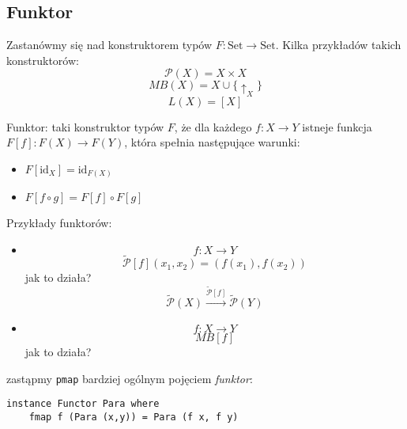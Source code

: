 \documentclass[11pt,a4paper]{article}
\begin{document}
\subsection{Funktor}
Zastanówmy się nad konstruktorem typów $F: \text{Set} \rightarrow \text{Set}$. Kilka przykładów takich konstruktorów:
\[
    \mathcal{P}(X) = X \times X
\]
\[
    MB(X) = X \cup \{ \uparrow_X \}
\]
\[
    L(X) = [X]
\]

Funktor: taki konstruktor typów $F$, że dla każdego $f: X \rightarrow Y$ istneje funkcja $F[f]: F(X) \rightarrow F(Y)$, która spełnia następujące warunki:
\begin{itemize}
    \item $F[\text{id}_X] = \text{id}_{F(X)}$
    \item $F[f \circ g] = F[f] \circ F[g]$
\end{itemize}
Przykłady funktorów:
\begin{itemize}
    \item
        \[
            f: X \rightarrow Y
        \]
        \[
            \tilde{\mathcal{P}}[f](x_1, x_2) = (f(x_1), f(x_2))
        \]
        jak to działa?
        \[
            \tilde{\mathcal{P}}(X) \xrightarrow{\tilde{\mathcal{P}}[f]} \tilde{\mathcal{P}}(Y)
        \]
    \item
        \[
            f: X \rightarrow Y
        \]
        \[
            MB[f]
        \]
        jak to działa?
        \[
        \]

\end{itemize}

zastąpmy \texttt{pmap} bardziej ogólnym pojęciem \textit{funktor}:
\begin{Verbatim}[frame=single]
instance Functor Para where
    fmap f (Para (x,y)) = Para (f x, f y)
\end{Verbatim}
\end{document}
